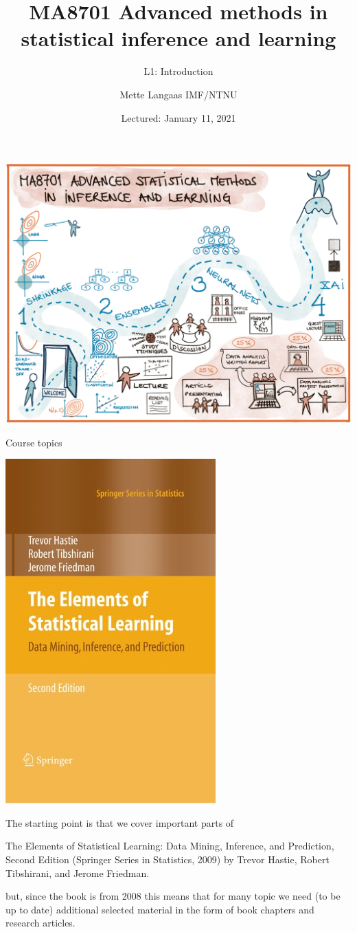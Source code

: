 \documentclass[
  ignorenonframetext,
]{beamer}
\title{MA8701 Advanced methods in statistical inference and learning}
\subtitle{L1: Introduction}
\author{Mette Langaas IMF/NTNU}
\date{Lectured: January 11, 2021}
\begin{document}
\frame{\titlepage}

\begin{frame}

\includegraphics{./overviewv2.png}

\end{frame}

\begin{frame}{Course topics}
\protect\hypertarget{course-topics}{}

\begin{flushleft}\includegraphics[width=0.2\linewidth]{ELSbookcover} \end{flushleft}

The starting point is that we cover important parts of

The Elements of Statistical Learning: Data Mining, Inference, and
Prediction, Second Edition (Springer Series in Statistics, 2009) by
Trevor Hastie, Robert Tibshirani, and Jerome Friedman.

but, since the book is from 2008 this means that for many topic we need
(to be up to date) additional selected material in the form of book
chapters and research articles.

\end{frame}
\end{document}
